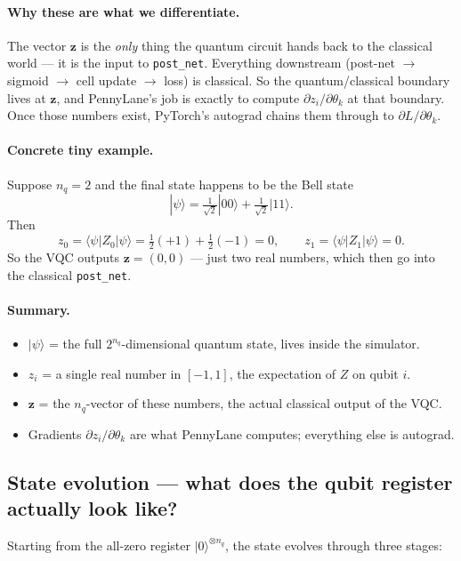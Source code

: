 \documentclass[11pt,a4paper]{article}
\begin{document}
\paragraph{Why these are what we differentiate.} The vector $\mathbf{z}$ is the \emph{only} thing the quantum circuit hands back to the classical world --- it is the input to \texttt{post\_net}. Everything downstream (post-net $\to$ sigmoid $\to$ cell update $\to$ loss) is classical. So the quantum/classical boundary lives at $\mathbf{z}$, and PennyLane's job is exactly to compute $\partial z_i / \partial \theta_k$ at that boundary. Once those numbers exist, PyTorch's autograd chains them through to $\partial L / \partial \theta_k$.

\paragraph{Concrete tiny example.} Suppose $n_q = 2$ and the final state happens to be the Bell state
\[
  |\psi\rangle = \tfrac{1}{\sqrt{2}}|00\rangle + \tfrac{1}{\sqrt{2}}|11\rangle.
\]
Then
\[
  z_0 = \langle\psi|Z_0|\psi\rangle = \tfrac{1}{2}(+1) + \tfrac{1}{2}(-1) = 0, \qquad
  z_1 = \langle\psi|Z_1|\psi\rangle = 0.
\]
So the VQC outputs $\mathbf{z} = (0, 0)$ --- just two real numbers, which then go into the classical \texttt{post\_net}.

\paragraph{Summary.}
\begin{itemize}
  \item $|\psi\rangle$ = the full $2^{n_q}$-dimensional quantum state, lives inside the simulator.
  \item $z_i$ = a single real number in $[-1, 1]$, the expectation of $Z$ on qubit $i$.
  \item $\mathbf{z}$ = the $n_q$-vector of these numbers, the actual classical output of the VQC.
  \item Gradients $\partial z_i / \partial \theta_k$ are what PennyLane computes; everything else is autograd.
\end{itemize}

\subsection{State evolution --- what does the qubit register actually look like?}

Starting from the all-zero register $|0\rangle^{\otimes n_q}$, the state evolves through three stages:
\end{document}
